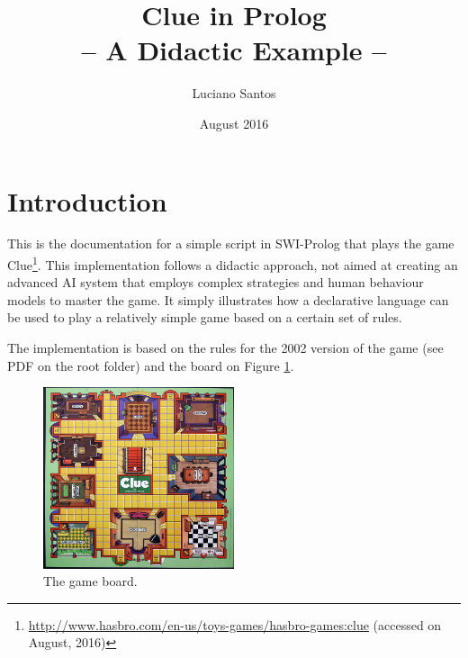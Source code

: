 \documentclass[12pt,a4paper]{article}
\title{Clue in Prolog\\{\Large -- A Didactic Example --}}
\author{Luciano Santos}
\date{August 2016}
\begin{document}
\maketitle

\section{Introduction}

This is the documentation for a simple script in SWI-Prolog that plays the game Clue\footnote{\url{http://www.hasbro.com/en-us/toys-games/hasbro-games:clue} (accessed on August, 2016)}. This implementation follows a didactic approach, not aimed at creating an advanced AI system that employs complex strategies and human behaviour models to master the game. It simply illustrates how a declarative language can be used to play a relatively simple game based on a certain set of rules.

The implementation is based on the rules for the 2002 version of the game (see PDF on the root folder) and the board on Figure \ref{fig:board}.

\begin{figure}[H]
	\centering
	\includegraphics[width=0.5\textwidth]{board.jpg}
	\caption{The game board.}
	\label{fig:board}
\end{figure}
\end{document}
